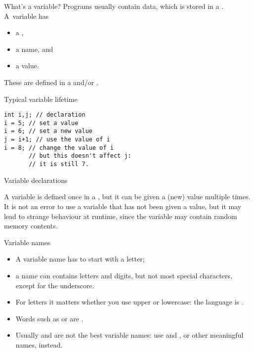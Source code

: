 \begin{slide}{What's a variable?}
  \label{sl:declaration}
  Programs usually contain data, which is stored in a
  . A~variable has
  \begin{itemize}
  \item a ,
  \item a name, and
  \item a value.
  \end{itemize}
  These are defined in a  and/or
  .
\end{slide}

\begin{block}{Typical variable lifetime}
  \label{sl:varlife}
\begin{lstlisting}
int i,j; // declaration
i = 5; // set a value
i = 6; // set a new value
j = i+1; // use the value of i
i = 8; // change the value of i
       // but this doesn't affect j:
       // it is still 7.
\end{lstlisting}
\end{block}

 {Variable declarations}

A variable is defined once
in a ,
but it can be given a (new) value multiple
times. It is not an error to use a variable that has not been given a
value, but it may lead to strange behaviour at runtime, since the
variable may contain random memory contents.

\begin{block}{Variable names}
  \label{sl:varname}
  \begin{itemize}
  \item
    A variable name has to start with a letter;
  \item a name can contains letters and  digits, but not most
    special characters, except for the underscore.
  \item For letters it matters
    whether you use upper or lowercase: the language is .
  \item Words such as  or  are .
  \item Usually  and  are not the best variable names: use
     and , or other meaningful names, instead.
  \end{itemize}
\end{block}

